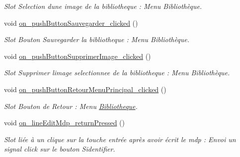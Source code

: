 \begin{DoxyCompactItemize}
\begin{DoxyCompactList}\small\item\em Slot Selection d\textquotesingle{}une image de la bibliotheque \+: Menu Bibliothèque. \end{DoxyCompactList}\item 
\mbox{\label{classMainWindow_a93279e87f7a6aa808619892c0c5f2f4a}} 
void \hyperlink{classMainWindow_a93279e87f7a6aa808619892c0c5f2f4a}{on\+\_\+push\+Button\+Sauvegarder\+\_\+clicked} ()
\begin{DoxyCompactList}\small\item\em Slot Bouton Sauvegarder la bibliotheque \+: Menu Bibliothèque. \end{DoxyCompactList}\item 
\mbox{\label{classMainWindow_ab4183704bae96b91f47d6f186612d4f9}} 
void \hyperlink{classMainWindow_ab4183704bae96b91f47d6f186612d4f9}{on\+\_\+push\+Button\+Supprimer\+Image\+\_\+clicked} ()
\begin{DoxyCompactList}\small\item\em Slot Supprimer l\textquotesingle{}image selectionnee de la bibliotheque \+: Menu Bibliothèque. \end{DoxyCompactList}\item 
\mbox{\label{classMainWindow_a2ec76fe0831835fa115ccfca42297af6}} 
void \hyperlink{classMainWindow_a2ec76fe0831835fa115ccfca42297af6}{on\+\_\+push\+Button\+Retour\+Menu\+Principal\+\_\+clicked} ()
\begin{DoxyCompactList}\small\item\em Slot Bouton de Retour \+: Menu \hyperlink{classBibliotheque}{Bibliotheque}. \end{DoxyCompactList}\item 
\mbox{\label{classMainWindow_a495b1763c99152a0a067d9efcd5867b6}} 
void \hyperlink{classMainWindow_a495b1763c99152a0a067d9efcd5867b6}{on\+\_\+line\+Edit\+Mdp\+\_\+return\+Pressed} ()
\begin{DoxyCompactList}\small\item\em Slot liée à un clique sur la touche entrée après avoir écrit le mdp \+: Envoi un signal click sur le bouton S\textquotesingle{}identifier. \end{DoxyCompactList}\item 
\mbox{\label{classMainWindow_ab6cdf8f1b4ab60072dc0ba1940e3544d}} 

\end{DoxyCompactItemize}
